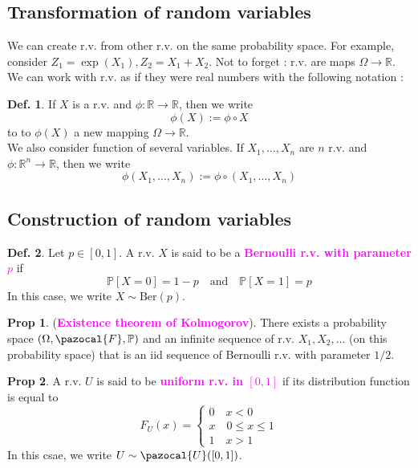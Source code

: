 \documentclass[8pt,a4paper,landscape]{article}
\theoremstyle{definition}
\newtheorem{definition}{Def.}[section]
\theoremstyle{example}
\theoremstyle{intuition}
\theoremstyle{definition}
\newtheorem{proposition}{Prop}[section]
\newcommand{\Fb}{\pazocal{F}}
\newcommand{\Ub}{\pazocal{U}}
\newcommand{\mydef}[1]{\textcolor{magenta}{\textbf{#1}}}
\newcommand{\prob}[1]{\mathbb{P}\left[ #1 \right]}
\begin{document}
\begin{multicols}{3}
				
			\subsection{Transformation of random variables}
				
				We can create r.v. from other r.v. on the same probability space. For example, consider $Z_1 = \exp(X_1), Z_2 = X_1 + X_2$. Not to forget : r.v. are maps $\Omega \to \mathbb{R}$.\\
				We can work with r.v. as if they were real numbers with the following notation :
				\begin{definition}
					If $X$ is a r.v. and $\phi : \mathbb{R} \to \mathbb{R}$, then we write 
					$$
						\phi(X) := \phi \circ X 
					$$
					to to $\phi(X)$ a new mapping $\Omega \to \mathbb{R}$.\\
					We also consider function of several variables. If $X_1, \ldots, X_n$ are $n$ r.v. and $\phi : \mathbb{R}^n \to \mathbb{R}$, then we write 
					$$
						\phi(X_1, \ldots, X_n) := \phi \circ (X_1, \ldots, X_n)
					$$
				\end{definition} 

			
			\subsection{Construction of random variables}
				
				\begin{definition}
					Let $p \in \left[0,1\right]$. A r.v. $X$ is said to be a \mydef{Bernoulli r.v. with parameter $p$} if 
					$$
					\prob{X = 0} = 1-p \quad \text{and} \quad \prob{X = 1} = p
					$$
				In this case, we write $X \sim \text{Ber}(p)$.
				\end{definition}

				\begin{proposition}
					(\mydef{Existence theorem of Kolmogorov}). There exists a probability space $(\Omega, \Fb, \mathbb{P})$ and an infinite sequence of r.v. $X_1, X_2, \ldots$ (on this probability space) that is an iid sequence of Bernoulli r.v. with parameter $1/2$.
				\end{proposition}

				\begin{proposition}
					A r.v. $U$ is said to be \mydef{uniform r.v. in $\left[0,1\right]$} if its distribution function is equal to 
					$$
					F_U(x) = \begin{cases}
						0 \quad x < 0 \\
						x \quad 0 \leq x \leq 1 \\
						1 \quad x > 1
					\end{cases}
					$$
					In this csae, we write $U \sim \Ub (\left[0,1\right])$.
				\end{proposition}


\end{multicols}
\end{document}

